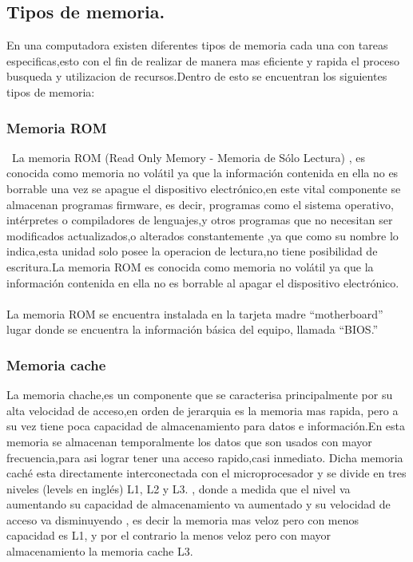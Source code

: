 \documentclass{article}
\begin{document}
\subsection{Tipos de memoria.} \label{tipos}%

En una computadora existen diferentes tipos de memoria cada una con tareas especificas,esto con el fin de realizar de manera mas eficiente y rapida el proceso busqueda y utilizacion de recursos.Dentro de esto se encuentran los siguientes tipos de memoria:

\subsubsection{Memoria ROM}\
La memoria ROM (Read Only Memory - Memoria de Sólo Lectura) \cite{augusto}, es conocida como memoria no volátil ya que la información contenida en ella
no es borrable una vez se apague el dispositivo electrónico,en este vital componente se almacenan programas firmware, es decir, programas como el
sistema operativo, intérpretes o compiladores de lenguajes,y otros programas que no necesitan ser modificados actualizados,o alterados constantemente \cite{memorias},ya que como su nombre lo indica,esta unidad  solo posee la operacion de lectura,no tiene posibilidad de escritura.La memoria ROM es conocida como memoria no volátil ya que la información contenida en ella no es borrable al apagar el dispositivo electrónico.\\\\
La memoria ROM se encuentra instalada en la tarjeta madre “motherboard” lugar donde se encuentra la información básica del equipo, llamada “BIOS.”

\subsubsection{Memoria cache}
La memoria chache,es un componente que se caracterisa  principalmente por su alta velocidad de acceso,en orden de jerarquia es la memoria mas rapida, pero a su vez tiene poca capacidad de almacenamiento para datos e información.En esta memoria se almacenan temporalmente los datos que son usados con mayor frecuencia,para asi lograr tener una acceso rapido,casi inmediato\cite{arquitectura}. Dicha memoria caché esta directamente interconectada con el microprocesador y se divide en tres niveles (levels en inglés) L1, L2 y L3. \cite{augusto}, donde a medida que el nivel va aumentando su capacidad de almacenamiento va aumentado y su velocidad de acceso va disminuyendo , es decir la memoria mas veloz pero con menos capacidad es L1, y por el contrario la menos veloz pero con mayor almacenamiento la memoria cache L3.
\end{document}
